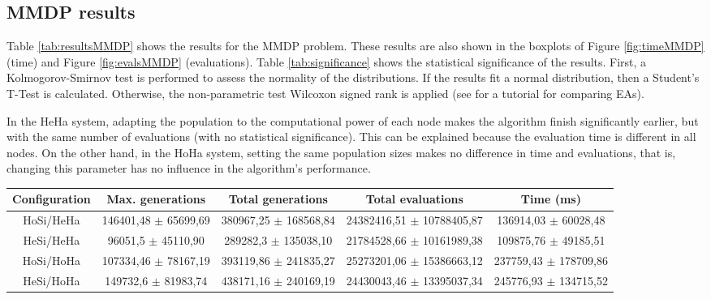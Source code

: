 \subsection{MMDP results}

Table \ref{tab:resultsMMDP} shows the results for the MMDP problem. These results are also shown in the boxplots of Figure \ref{fig:timeMMDP} (time) and Figure \ref{fig:evalsMMDP} (evaluations). Table \ref{tab:significance} shows the statistical significance of the results. First, a Kolmogorov-Smirnov test is performed to assess the normality of the distributions. If the results fit a normal distribution, then a Student's T-Test is calculated. Otherwise, the non-parametric test Wilcoxon signed rank is applied (see \cite{TUTORIAL} for a tutorial for comparing EAs).

 In the HeHa system, adapting the population to the computational
 power of each node makes the algorithm finish significantly earlier,
 but with the same number of evaluations (with no statistical
 significance). This can be explained because the evaluation time is
 different in all nodes. On the other hand, in the HoHa system,
 setting the same population sizes makes no difference in time and
 evaluations, that is, changing this parameter has no influence in the
 algorithm's performance.  

\begin{table*}
\centering
\caption{Results for the MMDP problem.}
\begin{tabular}{|c|c|c|c|c|} \hline
Configuration & Max. generations      & Total generations     &   Total evaluations     & Time (ms) \\ \hline
HoSi/HeHa   & 146401,48 $\pm$ 65699,69  & 380967,25 $\pm$ 168568,84 & 24382416,51 $\pm$ 10788405,87 & 136914,03 $\pm$ 60028,48\\ \hline
HeSi/HeHa   & 96051,5 $\pm$ 45110,90  & 289282,3  $\pm$ 135038,10 & 21784528,66 $\pm$ 10161989,38 & 109875,76 $\pm$ 49185,51\\ \hline \hline
HoSi/HoHa   & 107334,46 $\pm$ 78167,19  & 393119,86 $\pm$ 241835,27 & 25273201,06 $\pm$ 15386663,12 & 237759,43 $\pm$ 178709,86\\ \hline
HeSi/HoHa   & 149732,6 $\pm$ 81983,74 & 438171,16 $\pm$ 240169,19 & 24430043,46 $\pm$ 13395037,34 & 245776,93 $\pm$ 134715,52\\ \hline

\end{tabular}
\label{tab:resultsMMDP}
\end{table*}

